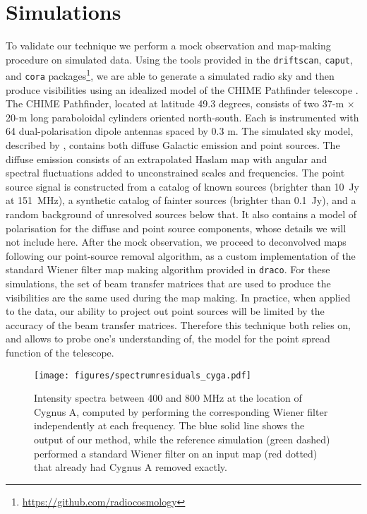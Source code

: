 \section{Simulations}
\label{sec:simulations}

To validate our technique we perform a mock observation and map-making procedure on simulated data. Using the tools provided in the \texttt{driftscan}, \texttt{caput}, and \texttt{cora} packages\footnote{\url{https://github.com/radiocosmology}}, we are able to generate a simulated radio sky and then produce visibilities using an idealized model of the CHIME Pathfinder telescope \citep{chimepath1}. The CHIME Pathfinder, located at latitude 49.3 degrees, consists of two 37-m $\times$ 20-m long paraboloidal cylinders oriented north-south. Each is instrumented with 64 dual-polarisation dipole antennas spaced by 0.3 m. The simulated sky model, described by \cite{mmodes2}, contains both diffuse Galactic emission and point sources. The diffuse emission consists of an extrapolated Haslam map \citep{haslam1981, haslam1982} with angular and spectral fluctuations added to unconstrained scales and frequencies. The point source signal is constructed from a catalog of known sources (brighter than 10~Jy at 151~MHz), a synthetic catalog of fainter sources (brighter than 0.1~Jy), and a random background of unresolved sources below that. It also contains a model of polarisation for the diffuse and point source components, whose details we will not include here. After the mock observation, we proceed to deconvolved maps following our point-source removal algorithm, as a custom implementation of the standard Wiener filter map making algorithm provided in \texttt{draco}. For these simulations, the set of beam transfer matrices that are used to produce the visibilities are the same used during the map making. In practice, when applied to the data, our ability to project out point sources will be limited by the accuracy of the beam transfer matrices. Therefore this technique both relies on, and allows to probe one's understanding of, the model for the point spread function of the telescope.

\begin{figure}
\centering
\texttt{[image: figures/spectrumresiduals\_cyga.pdf]}
\caption{Intensity spectra between 400 and 800 MHz at the location of Cygnus A, computed by performing the corresponding Wiener filter independently at each frequency. The blue solid line shows the output of our method, while the reference simulation (green dashed) performed a standard Wiener filter on an input map (red dotted) that already had Cygnus A removed exactly.}
\label{residuals}
\end{figure}

